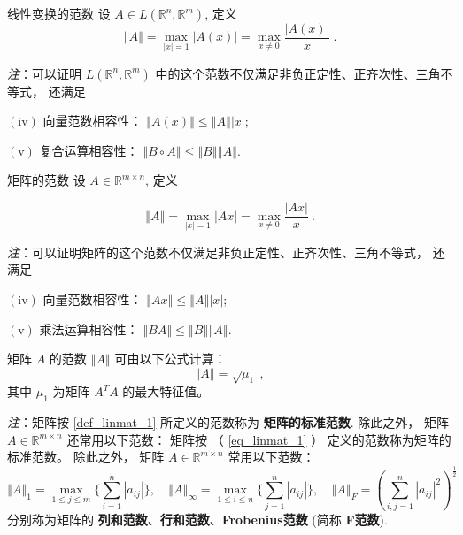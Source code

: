 \begin{definition}{线性变换的范数}
设 $A\in L(\mathbb{R}^{n},\mathbb{R}^{m})$, 定义
\[
\left\Vert A\right\Vert =\max_{|x|=1}|A(x)|=\max_{x\neq0}{\displaystyle \frac{|A(x)|}{x}}~.
\]
\end{definition}
\textsl{注}：可以证明 $L(\mathbb{R}^{n},\mathbb{R}^{m})$ 中的这个范数不仅满足非负正定性、正齐次性、三角不等式，
还满足

$(\mathrm{iv})$ 向量范数相容性： $\left\Vert A(x)\right\Vert \leqslant\left\Vert A\right\Vert \left|x\right|$;

$(\mathrm{v})$ 复合运算相容性： $\left\Vert B\circ A\right\Vert \leqslant\left\Vert B\right\Vert \left\Vert A\right\Vert $.



\begin{definition}{矩阵的范数}\label{def_linmat_1}
设 $A\in\mathbb{R}^{m\times n}$, 定义


\begin{equation}\label{eq_linmat_1}
\left\Vert A\right\Vert =\max_{|x|=1}|Ax|=\max_{x\neq0}{\displaystyle \frac{|Ax|}{x}}~.
\end{equation}


\end{definition}
\textsl{注}：可以证明矩阵的这个范数不仅满足非负正定性、正齐次性、三角不等式， 还满足

$(\mathrm{iv})$ 向量范数相容性： $\left\Vert Ax\right\Vert \leqslant\left\Vert A\right\Vert \left|x\right|$;

$(\mathrm{v})$ 乘法运算相容性： $\left\Vert BA\right\Vert \leqslant\left\Vert B\right\Vert \left\Vert A\right\Vert $.



\begin{theorem}{}
矩阵 $A$ 的范数 $\left\Vert A\right\Vert $ 可由以下公式计算： 
\[
\left\Vert A\right\Vert =\sqrt{\mu_{1}}~,
\]
 其中 $\mu_{1}$ 为矩阵 $A^{T}A$ 的最大特征值。 
\end{theorem}

\textsl{注}：矩阵按 \autoref{def_linmat_1} 所定义的范数称为 \textbf{矩阵的标准范数}. 除此之外， 矩阵 $A\in\mathbb{R}^{m\times n}$ 还常用以下范数：
矩阵按 （ \autoref{eq_linmat_1} ）  定义的范数称为矩阵的标准范数。 除此之外， 矩阵 $A\in\mathbb{R}^{m\times n}$ 常用以下范数：
\[
\left\Vert A\right\Vert _{1}=\max_{1\leqslant j\leqslant m}\{\sum_{i=1}^{n}|a_{ij}|\},\quad\left\Vert A\right\Vert _{\infty}=\max_{1\leqslant i\leqslant n}\{\sum_{j=1}^{n}|a_{ij}|\},\quad\left\Vert A\right\Vert _{F}=\left(\sum_{i,j=1}^{n}|a_{ij}|^{2}\right)^{\frac{1}{2}}~
\]
分别称为矩阵的 \textbf{列和范数}、\textbf{行和范数}、\textbf{Frobenius范数} (简称 \textbf{F范数}). 

